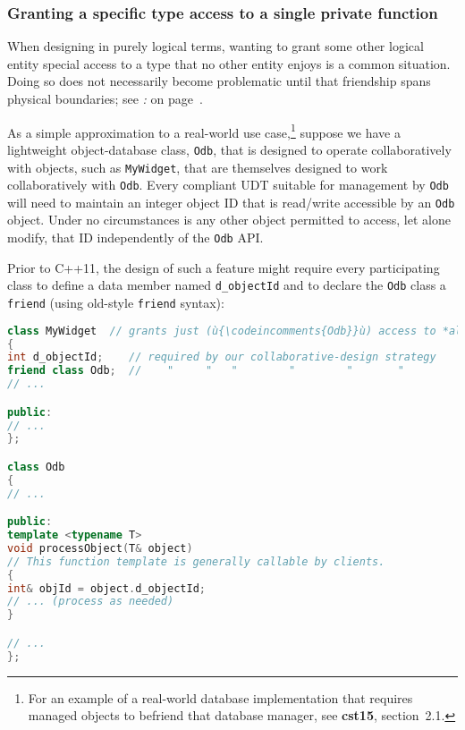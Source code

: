 \subsubsection[Granting a specific type access to a single {\tt private} function]{Granting a specific type access to a single {\SubsubsecCode private} function}\label{granting-a-specific-type-access-to-a-single-private-function}

When designing in purely logical terms, wanting to grant some other
logical entity special access to a type that no other entity enjoys is a
common situation. Doing so does not necessarily become problematic until
that friendship spans physical boundaries; see \textit{: } on page~\pageref{long-distance-friendship}.

As a simple approximation to a real-world use
case,\footnote{For an example of a real-world database
implementation that requires managed objects to befriend that database
manager, see \textbf{cst15}, section~2.1.} suppose we have a lightweight object-database class, \texttt{Odb}, that is designed to operate
collaboratively with objects, such as \texttt{MyWidget}, that are
themselves designed to work collaboratively with \texttt{Odb}. Every compliant UDT
suitable for management by \texttt{Odb} will need to maintain an integer
object ID that is read/write accessible by an \texttt{Odb} object. Under
no circumstances is any other object permitted to access, let alone
modify, that ID independently of the \texttt{Odb} API.

Prior to C++11, the design of such a feature might require every
participating class to define a data member named \texttt{d\_objectId}
and to declare the \texttt{Odb} class a \texttt{friend} (using old-style
\texttt{friend} syntax):

\begin{lstlisting}[language=C++]
class MyWidget  // grants just (ù{\codeincomments{Odb}}ù) access to *all* of its private data
{
int d_objectId;    // required by our collaborative-design strategy
friend class Odb;  //    "     "   "        "        "       "
// ...

public:
// ...
};

class Odb
{
// ...

public:
template <typename T>
void processObject(T& object)
// This function template is generally callable by clients.
{
int& objId = object.d_objectId;
// ... (process as needed)
}

// ...
};
\end{lstlisting}

